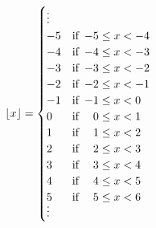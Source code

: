 \documentclass{ximera}
\begin{document}
\begin{example}
\begin{explanation}
$ \lfloor x \rfloor = \begin{cases} 
\vdots & \\
-5 & \text{if $\,-5 \leq x < -4$} \\
-4 & \text{if $\,-4 \leq x < -3$} \\
-3 & \text{if $\,-3 \leq x < -2$} \\
-2 & \text{if $\,-2 \leq x < -1$} \\
-1 & \text{if $\,-1 \leq x < 0$} \\
0 & \text{if $\,\hphantom{-}0 \leq x < 1$} \\
1 & \text{if $\,\hphantom{-}1 \leq x < 2$} \\
2 & \text{if $\,\hphantom{-}2 \leq x < 3$} \\
3 & \text{if $\,\hphantom{-}3 \leq x < 4$} \\
4 & \text{if $\,\hphantom{-}4 \leq x < 5$} \\
5 & \text{if $\,\hphantom{-}5 \leq x < 6$} \\ 
\smash{\vdots} & \end{cases} $


%  



\end{explanation}
\end{example}
\end{document}
